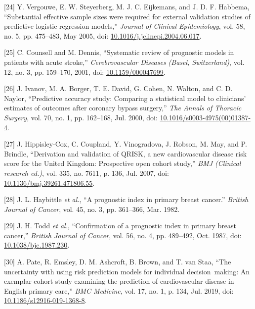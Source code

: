 \documentclass[
]{article}
\newenvironment{cslreferences}%
  {}%
  {\par}
\begin{document}
\begin{cslreferences}
\leavevmode\hypertarget{ref-vergouwe_substantial_2005}{}%
{[}24{]} Y. Vergouwe, E. W. Steyerberg, M. J. C. Eijkemans, and J. D. F. Habbema, ``Substantial effective sample sizes were required for external validation studies of predictive logistic regression models,'' \emph{Journal of Clinical Epidemiology}, vol. 58, no. 5, pp. 475--483, May 2005, doi: \href{https://doi.org/10.1016/j.jclinepi.2004.06.017}{10.1016/j.jclinepi.2004.06.017}.

\leavevmode\hypertarget{ref-counsell_systematic_2001}{}%
{[}25{]} C. Counsell and M. Dennis, ``Systematic review of prognostic models in patients with acute stroke,'' \emph{Cerebrovascular Diseases (Basel, Switzerland)}, vol. 12, no. 3, pp. 159--170, 2001, doi: \href{https://doi.org/10.1159/000047699}{10.1159/000047699}.

\leavevmode\hypertarget{ref-ivanov_predictive_2000}{}%
{[}26{]} J. Ivanov, M. A. Borger, T. E. David, G. Cohen, N. Walton, and C. D. Naylor, ``Predictive accuracy study: Comparing a statistical model to clinicians' estimates of outcomes after coronary bypass surgery,'' \emph{The Annals of Thoracic Surgery}, vol. 70, no. 1, pp. 162--168, Jul. 2000, doi: \href{https://doi.org/10.1016/s0003-4975(00)01387-4}{10.1016/s0003-4975(00)01387-4}.

\leavevmode\hypertarget{ref-hippisley-cox_derivation_2007}{}%
{[}27{]} J. Hippisley-Cox, C. Coupland, Y. Vinogradova, J. Robson, M. May, and P. Brindle, ``Derivation and validation of QRISK, a new cardiovascular disease risk score for the United Kingdom: Prospective open cohort study,'' \emph{BMJ (Clinical research ed.)}, vol. 335, no. 7611, p. 136, Jul. 2007, doi: \href{https://doi.org/10.1136/bmj.39261.471806.55}{10.1136/bmj.39261.471806.55}.

\leavevmode\hypertarget{ref-haybittle_prognostic_1982}{}%
{[}28{]} J. L. Haybittle \emph{et al.}, ``A prognostic index in primary breast cancer.'' \emph{British Journal of Cancer}, vol. 45, no. 3, pp. 361--366, Mar. 1982.

\leavevmode\hypertarget{ref-todd_confirmation_1987}{}%
{[}29{]} J. H. Todd \emph{et al.}, ``Confirmation of a prognostic index in primary breast cancer,'' \emph{British Journal of Cancer}, vol. 56, no. 4, pp. 489--492, Oct. 1987, doi: \href{https://doi.org/10.1038/bjc.1987.230}{10.1038/bjc.1987.230}.

\leavevmode\hypertarget{ref-pate_uncertainty_2019}{}%
{[}30{]} A. Pate, R. Emsley, D. M. Ashcroft, B. Brown, and T. van Staa, ``The uncertainty with using risk prediction models for individual decision~making: An exemplar cohort study examining the prediction of cardiovascular disease in English primary care,'' \emph{BMC Medicine}, vol. 17, no. 1, p. 134, Jul. 2019, doi: \href{https://doi.org/10.1186/s12916-019-1368-8}{10.1186/s12916-019-1368-8}.


\end{cslreferences}
\end{document}
